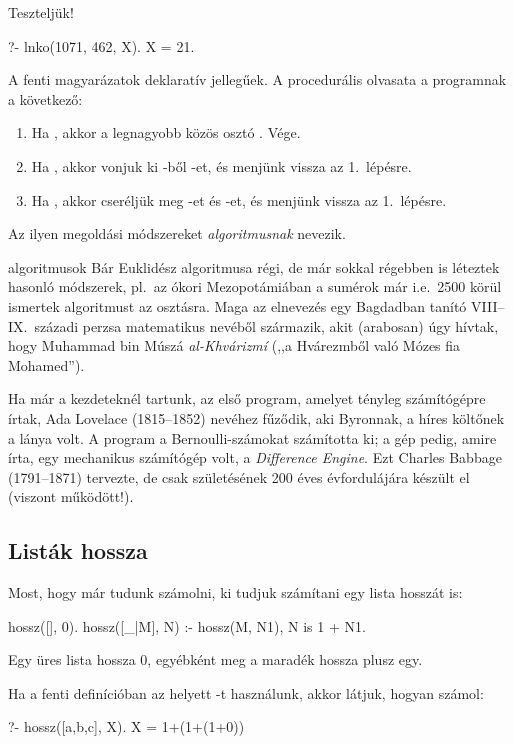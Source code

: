Teszteljük!
\begin{query}
?- lnko(1071, 462, X).
X = 21.
\end{query}

A fenti magyarázatok deklaratív jellegűek. A
procedurális olvasata a programnak a következő:
\begin{enumerate}
\item Ha , akkor a legnagyobb közös osztó
  . Vége.
\item Ha , akkor vonjuk ki -ből
  -et, és menjünk vissza az 1.~lépésre.
\item Ha , akkor cseréljük meg -et
  és -et, és menjünk vissza az 1.~lépésre.
\end{enumerate}
Az ilyen megoldási módszereket \emph{algoritmusnak}
nevezik.

\begin{infobox}{}{algoritmusok}
Bár Euklidész algoritmusa régi, de már sokkal
régebben is léteztek hasonló módszerek, pl.~az ókori
Mezopotámiában a sumérok már i.e.~2500 körül
ismertek algoritmust az osztásra. Maga az elnevezés
egy Bagdadban tanító VIII--IX.~századi perzsa
matematikus nevéből származik, akit (arabosan) úgy
hívtak, hogy Muhammad bin Múszá \emph{al-Khvárizmí}
(,,a Hvárezmből való Mózes fia Mohamed'').

Ha már a kezdeteknél tartunk, az első program, amelyet
tényleg számítógépre írtak, Ada Lovelace (1815--1852)
nevéhez fűződik, aki Byronnak, a híres költőnek
a lánya volt. A program a Bernoulli-számokat számította
ki; a gép pedig, amire írta, egy mechanikus
számítógép volt, a \emph{Difference Engine}. Ezt
Charles Babbage (1791--1871) tervezte, de csak
születésének 200 éves évfordulájára készült el
(viszont működött!).
\end{infobox}

\subsection*{Listák hossza}
Most, hogy már tudunk számolni, ki tudjuk számítani
egy lista hosszát is:
\begin{program}
hossz([], 0).
hossz([_|M], N) :- hossz(M, N1), N is 1 + N1.
\end{program}
Egy üres lista hossza 0, egyébként meg a maradék
hossza plusz egy.

Ha a fenti definícióban az  helyett \pr{=}-t
használunk, akkor látjuk, hogyan számol:
\begin{query}
?- hossz([a,b,c], X).
X = 1+(1+(1+0))
\end{query}

